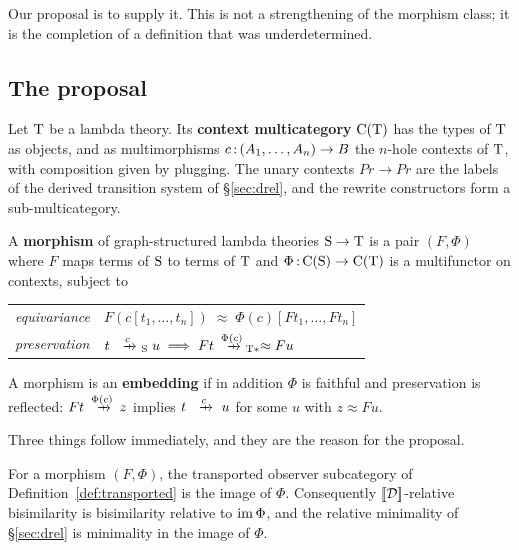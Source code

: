 \documentclass{article}
\begin{document}
Our proposal is to supply it. This is not a strengthening of the morphism class; it is the completion of a definition that was underdetermined.

\subsection{The proposal}

\begin{definition}
\label{def:ctxmulti}
    Let $\mathrm{T}$ be a lambda theory. Its \textbf{context multicategory} $\mathrm{C}(\mathrm{T})$ has the types of $\mathrm{T}$ as objects, and as multimorphisms $c\,{:}\, (A_1,\dots,A_n)\to B$ the $n$-hole contexts of $\mathrm{T}$, with composition given by plugging. The unary contexts $Pr\to Pr$ are the labels of the derived transition system of \S\ref{sec:drel}, and the rewrite constructors form a sub-multicategory.
\end{definition}

\begin{definition}
\label{def:gsltmor}
    A \textbf{morphism} of graph-structured lambda theories $\mathrm{S}\to\mathrm{T}$ is a pair $(F,\Phi)$ where $F$ maps terms of $\mathrm{S}$ to terms of $\mathrm{T}$ and $\Phi\,{:}\, \mathrm{C}(\mathrm{S})\to\mathrm{C}(\mathrm{T})$ is a multifunctor on contexts, subject to
    \begin{center}
    \renewcommand{\arraystretch}{1.4}
    \begin{tabular}{ll}
        \emph{equivariance} & $F(c[t_1,\dots,t_n])\;\approx\;\Phi(c)[F t_1,\dots,F t_n]$\\
        \emph{preservation} & $t\xr{c}_{\mrm{S}} u \;\Longrightarrow\; Ft \xr{\Phi(c)}_{\T\ast} \approx Fu$
    \end{tabular}
    \end{center}
    A morphism is an \textbf{embedding} if in addition $\Phi$ is faithful and preservation is reflected: $Ft\xr{\Phi(c)}z$ implies $t\xr{c}u$ for some $u$ with $z\approx Fu$.
\end{definition}

Three things follow immediately, and they are the reason for the proposal.

\begin{proposition}
\label{prop:dimphi}
    For a morphism $(F,\Phi)$, the transported observer subcategory of Definition~\ref{def:transported} is the image of $\Phi$. Consequently $[\![\mathcal{D}]\!]$-relative bisimilarity is bisimilarity relative to $\mathrm{im}\,\Phi$, and the relative minimality of \S\ref{sec:drel} is minimality in the image of $\Phi$.
\end{proposition}
\end{document}

